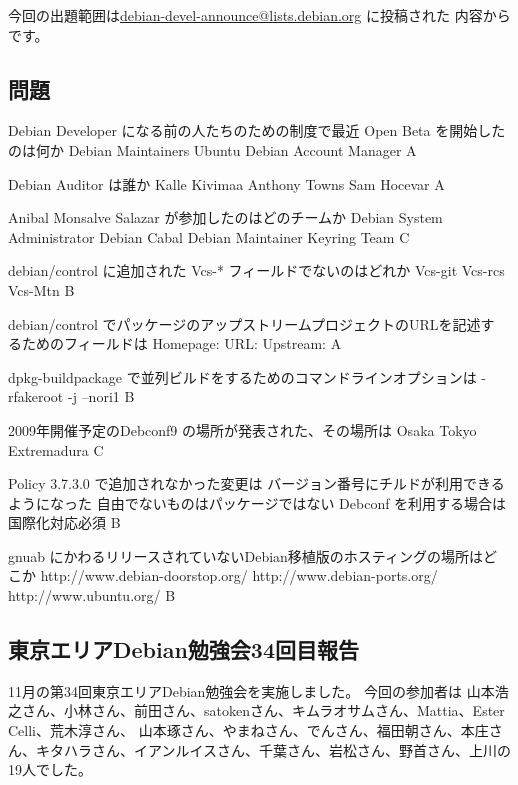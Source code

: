 \documentclass[mingoth,a4paper]{jsarticle}
\begin{document}
今回の出題範囲は\url{debian-devel-announce@lists.debian.org} に投稿された
内容からです。
\begin{multicols}{2}
 
 \subsection{問題}

 \santaku
 {Debian Developer になる前の人たちのための制度で最近 Open Beta を開始したのは何か}
 {Debian Maintainers}
 {Ubuntu}
 {Debian Account Manager}
 {A}

 \santaku
 {Debian Auditor は誰か}
 {Kalle Kivimaa}
 {Anthony Towns}
 {Sam Hocevar}
 {A}

 \santaku
 {Anibal Monsalve Salazar が参加したのはどのチームか}
 {Debian System Administrator}
 {Debian Cabal}
 {Debian Maintainer Keyring Team}
 {C}

 \santaku
 {debian/control に追加された Vcs-* フィールドでないのはどれか}
 {Vcs-git}
 {Vcs-rcs}
 {Vcs-Mtn}
 {B}

 \santaku
 {debian/control でパッケージのアップストリームプロジェクトのURLを記述す
 るためのフィールドは}
 {Homepage:}
 {URL:}
 {Upstream:}
 {A}

 \santaku
 {dpkg-buildpackage で並列ビルドをするためのコマンドラインオプションは}
 {-rfakeroot}
 {-j}
 {--nori1}
 {B}

 \santaku
 {2009年開催予定のDebconf9 の場所が発表された、その場所は}
 {Osaka}
 {Tokyo}
 {Extremadura}
 {C}

 \santaku
 {Policy 3.7.3.0 で追加されなかった変更は}
 {バージョン番号にチルドが利用できるようになった}
 {自由でないものはパッケージではない}
 {Debconf を利用する場合は国際化対応必須}
 {B}

 \santaku
 {gnuab にかわるリリースされていないDebian移植版のホスティングの場所はど
 こか}
 {http://www.debian-doorstop.org/}
 {http://www.debian-ports.org/}
 {http://www.ubuntu.org/}
 {B}

\end{multicols}

\subsection{東京エリアDebian勉強会34回目報告}


	  11月の第34回東京エリアDebian勉強会を実施しました。
	  	  今回の参加者は
	  山本浩之さん、小林さん、前田さん、satokenさん、キムラオサムさん、Mattia、Ester Celli、荒木淳さん、
	  山本琢さん、やまねさん、でんさん、福田朝さん、本庄さん、キタハラさん、イアンルイスさん、千葉さん、岩松さん、野首さん、上川の19人でした。
        
\end{document}
